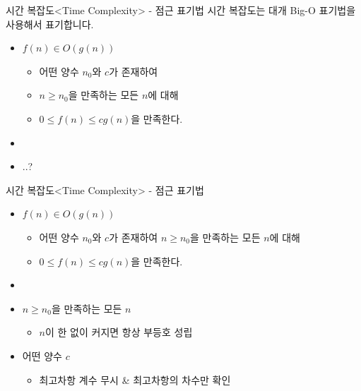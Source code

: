 \begin{frame}{시간 복잡도}{<Time Complexity> - 점근 표기법}
  시간 복잡도는 대개 Big-O 표기법을 사용해서 표기합니다.
  \vspace{3mm}
  \begin{itemize}
    \item $f(n) \in O\left(g(n)\right)$
    \begin{itemize}
      \item 어떤 양수 $n_0$와 $c$가 존재하여
      \item $n \ge n_0$을 만족하는 모든 $n$에 대해
      \item $0 \le f(n) \le cg(n)$을 만족한다.
    \end{itemize}
    \item[] \vspace{2mm}
    \item ..?
  \end{itemize}
\end{frame}

\begin{frame}{시간 복잡도}{<Time Complexity> - 점근 표기법}
  \begin{itemize}
    \item $f(n) \in O\left(g(n)\right)$
    \begin{itemize}
      \item 어떤 양수 $n_0$와 $c$가 존재하여 $n \ge n_0$을 만족하는 모든 $n$에 대해
      \item $0 \le f(n) \le cg(n)$을 만족한다.
    \end{itemize}
    \item[] \vspace{3mm}
    \item $n \ge n_0$을 만족하는 모든 $n$
    \begin{itemize}
      \item $n$이 \alert{한 없이 커지면} 항상 부등호 성립
    \end{itemize}
    \item 어떤 양수 $c$
    \begin{itemize}
      \item 최고차항 \alert{계수 무시} \& 최고차항의 \alert{차수만 확인}
    \end{itemize}
  \end{itemize}
\end{frame}

